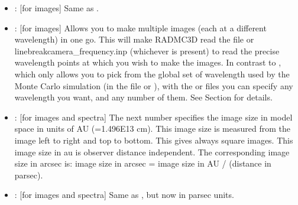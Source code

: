 \documentclass[letterpaper,10pt,english]{sphinxmanual}
\begin{document}
\begin{itemize}
\item {} 
: {[}for images{]} Same as .

\item {} 
: {[}for images{]} Allows you to make multiple images (each at a
different wavelength) in one go. This will make RADMC\sphinxhyphen{}3D read the file
 or linebreak\textasciigrave{}\textasciigrave{}camera\_frequency.inp\textasciigrave{}\textasciigrave{}
(whichever is present) to read the precise wavelength points at which you wish
to make the images. In contrast to , which only allows you to
pick from the global set of wavelength used by the Monte Carlo simulation (in
the file  or ), with the
 or  files you can
specify any wavelength you want, and any number of them. See Section
{\hyperref[\detokenize{imagesspectra:sec-set-camera-frequencies}]{}} for details.

\item {} 
: {[}for images and spectra{]} The next number
specifies the image size in model space in units of AU (=1.496E13
cm). This image size is measured from the image left to
right and top to bottom. This gives always square images. This image
size in au is observer distance independent. The corresponding image
size in arcsec is: image size in arcsec = image size in AU /
(distance in parsec).

\item {} 
: {[}for images and spectra{]} Same as , but
now in parsec units.


\end{itemize}
\end{document}
